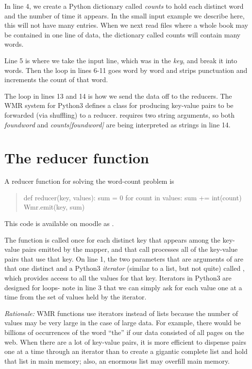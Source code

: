\documentclass[letterpaper,10pt,openany,oneside]{sphinxmanual}
\begin{document}
In line 4, we create a Python dictionary called \emph{counts} to hold
each distinct word and the number of time it appears. In the small
input example we describe here, this will not have many entries.
When we next read files where a whole book may be contained in one
line of data, the dictionary called counts will contain many
words.

Line 5 is where we take the input line, which was in the \emph{key}, and
break it into words. Then the loop in lines 6-11 goes word by word
and strips punctuation and increments the count of that word.

The loop in lines 13 and 14 is how we send the data off to the
reducers. The WMR system for Python3 defines a class  for producing key-value pairs to
be forwarded (via shuffling) to a reducer.  requires
two string arguments, so both \emph{foundword} and \emph{counts{[}foundword{]}}
are being interpreted as strings in line 14.


\section{The reducer function}
\label{wmr_py/wmr_py:the-reducer-function}
A reducer function for solving the word-count problem is
\begin{quote}

def reducer(key, values): sum = 0 for count in values: sum +=
int(count) Wmr.emit(key, sum)
\end{quote}

This code is available on moodle as .

The function  is called once for each distinct key
that appears among the key-value pairs emitted by the mapper, and
that call processes all of the key-value pairs that use that key.
On line 1, the two parameters that are arguments of 
are that one distinct  and a Python3 \emph{iterator} (similar to a
list, but not quite) called , which provides access to
all the values for that key. Iterators in Python3 are designed for
 loops- note in line 3 that we can simply ask for each value
one at a time from the set of values held by the iterator.

\emph{Rationale:} WMR  functions use iterators instead of
lists because the number of values may be very large in the case of
large data. For example, there would be billions of occurrences of
the word ``the'' if our data consisted of all pages on the web. When
there are a lot of key-value pairs, it is more efficient to
dispense pairs one at a time through an iterator than to create a
gigantic complete list and hold that list in main memory; also, an
enormous list may overfill main memory.
\end{document}
